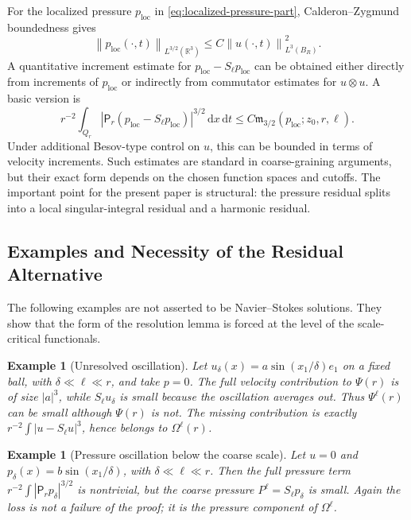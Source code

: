 \documentclass[11pt]{article}
\numberwithin{equation}{section}
\newtheorem{example}[theorem]{Example}
\newcommand{\R}{\mathbb R}
\newcommand{\loc}{\mathrm{loc}}
\newcommand{\dxdt}{\,\mathrm dx\,\mathrm dt}
\newcommand{\norm}[2]{\left\lVert #1\right\rVert_{#2}}
\newcommand{\Pf}{\mathsf P}
\begin{document}
For the localized pressure $p_{\loc}$ in \eqref{eq:localized-pressure-part}, Calderon--Zygmund boundedness gives
\begin{equation}\label{eq:CZ-pressure-bound}
\norm{p_{\loc}(\cdot,t)}{L^{3/2}(\R^3)}
\le C\norm{u(\cdot,t)}{L^3(B_R)}^2.
\end{equation}
A quantitative increment estimate for $p_{\loc}-S_\ell p_{\loc}$ can be obtained either directly from increments of $p_{\loc}$ or indirectly from commutator estimates for $u\otimes u$.  A basic version is
\begin{equation}\label{eq:ploc-increment-bound}
r^{-2}\int_{Q_r}|\Pf_r(p_{\loc}-S_\ell p_{\loc})|^{3/2}\dxdt
\le C\mathfrak m_{3/2}(p_{\loc};z_0,r,\ell).
\end{equation}
Under additional Besov-type control on $u$, this can be bounded in terms of velocity increments.  Such estimates are standard in coarse-graining arguments, but their exact form depends on the chosen function spaces and cutoffs.  The important point for the present paper is structural: the pressure residual splits into a local singular-integral residual and a harmonic residual.
\subsection{Examples and Necessity of the Residual Alternative}

The following examples are not asserted to be Navier--Stokes solutions.  They show that the form of the resolution lemma is forced at the level of the scale-critical functionals.

\begin{example}[Unresolved oscillation]
Let $u_\delta(x)=a\sin(x_1/\delta)e_1$ on a fixed ball, with $\delta\ll\ell\ll r$, and take $p=0$.  The full velocity contribution to $\Psi(r)$ is of size $|a|^3$, while $S_\ell u_\delta$ is small because the oscillation averages out.  Thus $\Psi^\ell(r)$ can be small although $\Psi(r)$ is not.  The missing contribution is exactly $r^{-2}\int|u-S_\ell u|^3$, hence belongs to $\Omega^\ell(r)$.
\end{example}

\begin{example}[Pressure oscillation below the coarse scale]
Let $u=0$ and $p_\delta(x)=b\sin(x_1/\delta)$, with $\delta\ll\ell\ll r$.  Then the full pressure term $r^{-2}\int|\Pf_r p_\delta|^{3/2}$ is nontrivial, but the coarse pressure $P^\ell=S_\ell p_\delta$ is small.  Again the loss is not a failure of the proof; it is the pressure component of $\Omega^\ell$.
\end{example}
\end{document}
